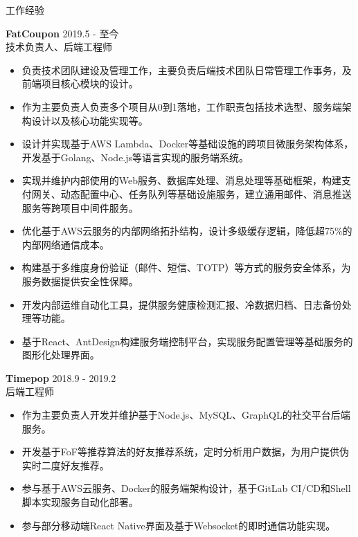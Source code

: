 \documentclass{resume} %
\begin{document}
\begin{rSection}{工作经验}

\textbf{FatCoupon} \hfill 2019.5 - 至今\\
技术负责人、后端工程师 \hfill \textit{}
\begin{itemize}
  \itemsep -3pt {}
  \item 负责技术团队建设及管理工作，主要负责后端技术团队日常管理工作事务，及前端项目核心模块的设计。
  \item 作为主要负责人负责多个项目从0到1落地，工作职责包括技术选型、服务端架构设计以及核心功能实现等。
  \item 设计并实现基于AWS Lambda、Docker等基础设施的跨项目微服务架构体系，开发基于Golang、Node.js等语言实现的服务端系统。
  \item 实现并维护内部使用的Web服务、数据库处理、消息处理等基础框架，构建支付网关、动态配置中心、任务队列等基础设施服务，建立通用邮件、消息推送服务等跨项目中间件服务。
  \item 优化基于AWS云服务的内部网络拓扑结构，设计多级缓存逻辑，降低超75\%的内部网络通信成本。
  \item 构建基于多维度身份验证（邮件、短信、TOTP）等方式的服务安全体系，为服务数据提供安全性保障。
  \item 开发内部运维自动化工具，提供服务健康检测汇报、冷数据归档、日志备份处理等功能。
  \item 基于React、AntDesign构建服务端控制平台，实现服务配置管理等基础服务的图形化处理界面。
\end{itemize}

\textbf{Timepop} \hfill 2018.9 - 2019.2\\
后端工程师 \hfill \textit{}
\begin{itemize}
  \itemsep -3pt {}
  \item 作为主要负责人开发并维护基于Node.js、MySQL、GraphQL的社交平台后端服务。
  \item 开发基于FoF等推荐算法的好友推荐系统，定时分析用户数据，为用户提供伪实时二度好友推荐。
  \item 参与基于AWS云服务、Docker的服务端架构设计，基于GitLab CI/CD和Shell脚本实现服务自动化部署。
  \item 参与部分移动端React Native界面及基于Websocket的即时通信功能实现。
\end{itemize}


\end{rSection}
\end{document}
